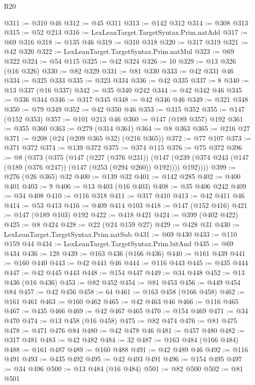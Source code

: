 \begin{lexlean}{R20}
\begin{coremodule}
{{{{{{{{{{{{{{{{{{{@311 := @310 @46
@312 := @45 @311
@313 := @142 @312
@314 := @308 @313
@315 := @52 @213
@316 := LexLeanTarget.TargetSyntax.Prim.natAdd
@317 := @69 @316
@318 := @135 @46
@319 := @310 @318
@320 := @317 @319
@321 := @42 @320
@322 := LexLeanTarget.TargetSyntax.Prim.natMul
@323 := @69 @322
@324 := @54 @115
@325 := @42 @324
@326 := 10
@329 := @13 @326 (@16 @326)
@330 := @82 @329
@331 := @81 @330
@333 := @42 @331 @46
@334 := @325 @333
@335 := @323 @334
@336 := @42 @335
@337 := 8
@340 := @13 @337 (@16 @337)
@342 := @35 @340 @242
@344 := @42 @342 @46
@345 := @336 @344
@346 := @317 @345
@348 := @42 @346 @46
@349 := @321 @348
@350 := @79 @349
@352 := @42 @350 @46
@353 := @315 @352
@355 := @147 (@152 @353)
@357 := @101 @213 @46
@360 := @147 (@189 @357) @192
@361 := @355 @360
@363 := @279 (@314 @361)
@364 := @8 @363
@365 := @216 @27
@371 := @208 (@24 (@209 @365 @32) (@216 @365))
@372 := @77 @107
@373 := @371 @372
@374 := @139 @372
@375 := @374 @115
@376 := @75 @372
@396 := @8
    (@373
      (@375
        (@147
          (@227 (@376 @231))
          (@147 (@239 (@374 @243 (@147 (@189 (@376 @247)) (@147 (@253 (@294 @260)) @192)))) @192))))
@399 := @276 (@26 @365) @32
@400 := @139 @32
@401 := @142 @285
@402 := @400 @401
@403 := 9
@406 := @13 @403 (@16 @403)
@408 := @35 @406 @242
@409 := @34 @408
@410 := @116 @318
@411 := @317 @410
@413 := @42 @411 @46
@414 := @53 @413
@416 := @409 @414 @103
@418 := @147 (@152 @416)
@421 := @147 (@189 @103) @192
@422 := @418 @421
@424 := @399 (@402 @422)
@425 := @8 @424
@428 := @22 (@24 @159 @27)
@429 := @428 @31
@430 := LexLeanTarget.TargetSyntax.Prim.natSub
@431 := @69 @430
@433 := @110 @159 @44
@434 := LexLeanTarget.TargetSyntax.Prim.bitAnd
@435 := @69 @434
@436 := 128
@439 := @163 @436 (@166 @436)
@440 := @161 @439
@441 := @160 @440
@443 := @42 @441 @46
@444 := @116 @443
@445 := @435 @444
@447 := @42 @445 @443
@448 := @154 @447
@449 := @34 @448
@452 := @13 @436 (@16 @436)
@453 := @82 @452
@454 := @81 @453
@456 := @449 @454 @84
@457 := @42 @456
@458 := 64
@461 := @163 @458 (@166 @458)
@462 := @161 @461
@463 := @160 @462
@465 := @42 @463 @46
@466 := @116 @465
@467 := @435 @466
@469 := @42 @467 @465
@470 := @154 @469
@471 := @34 @470
@474 := @13 @458 (@16 @458)
@475 := @82 @474
@476 := @81 @475
@478 := @471 @476 @84
@480 := @42 @478 @46
@481 := @457 @480
@482 := @317 @481
@483 := @42 @482
@484 := 32
@487 := @163 @484 (@166 @484)
@488 := @161 @487
@489 := @160 @488
@491 := @42 @489 @46
@492 := @116 @491
@493 := @435 @492
@495 := @42 @493 @491
@496 := @154 @495
@497 := @34 @496
@500 := @13 @484 (@16 @484)
@501 := @82 @500
@502 := @81 @501
}}}}}}}}}}}}}}}}}}}
\end{coremodule}
\end{lexlean}
